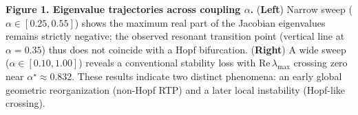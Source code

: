 \textbf{Figure 1. Eigenvalue trajectories across coupling $\alpha$.}
(\textbf{Left}) Narrow sweep ($\alpha\in[0.25,0.55]$) shows the maximum real part of the Jacobian eigenvalues remains strictly negative; the observed resonant transition point (vertical line at $\alpha=0.35$) thus does not coincide with a Hopf bifurcation.
(\textbf{Right}) A wide sweep ($\alpha\in[0.10,1.00]$) reveals a conventional stability loss with $\mathrm{Re}\,\lambda_{\max}$ crossing zero near $\alpha^\star\approx0.832$. These results indicate two distinct phenomena: an early global geometric reorganization (non-Hopf RTP) and a later local instability (Hopf-like crossing).

